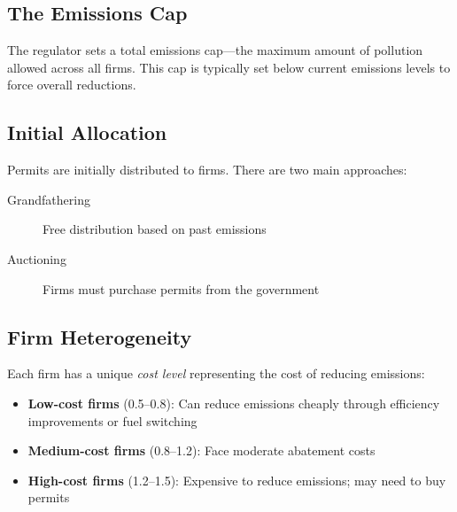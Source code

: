 \documentclass{tufte-handout}\usepackage[]{graphicx}\usepackage[]{xcolor}
\begin{document}
\subsection{The Emissions Cap}

The regulator sets a total emissions cap---the maximum amount of pollution allowed across all firms. This cap is typically set below current emissions levels to force overall reductions.


\subsection{Initial Allocation}

Permits are initially distributed to firms. There are two main approaches:

\begin{description}
\item[Grandfathering] Free distribution based on past emissions
\item[Auctioning] Firms must purchase permits from the government
\end{description}

\subsection{Firm Heterogeneity}

Each firm has a unique \textit{cost level} representing the cost of reducing emissions:

\begin{itemize}
\item \textbf{Low-cost firms} (0.5--0.8): Can reduce emissions cheaply through efficiency improvements or fuel switching
\item \textbf{Medium-cost firms} (0.8--1.2): Face moderate abatement costs
\item \textbf{High-cost firms} (1.2--1.5): Expensive to reduce emissions; may need to buy permits
\end{itemize}
\end{document}
